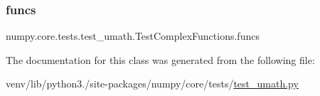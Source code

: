 \subsubsection{\texorpdfstring{funcs}{funcs}}
{\footnotesize\ttfamily numpy.\+core.\+tests.\+test\+\_\+umath.\+Test\+Complex\+Functions.\+funcs\hspace{0.3cm}{\ttfamily [static]}}



The documentation for this class was generated from the following file\+:\begin{DoxyCompactItemize}
\item 
venv/lib/python3./site-\/packages/numpy/core/tests/\hyperlink{test__umath_8py}{test\+\_\+umath.\+py}\end{DoxyCompactItemize}
